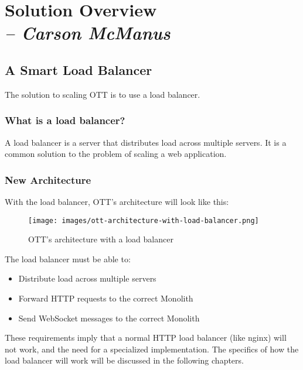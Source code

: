 \chapter{Solution Overview \\
  \small{\textit{-- Carson McManus}}
  \label{Chapter::SolutionOverview}}

\section{A Smart Load Balancer}

The solution to scaling OTT is to use a load balancer.

\subsection{What is a load balancer?}

A load balancer is a server that distributes load across multiple servers. It is a common solution to the problem of scaling a web application.

\subsection{New Architecture}

With the load balancer, OTT's architecture will look like this:

\begin{figure}[!h]
  \centering
  \texttt{[image: images/ott-architecture-with-load-balancer.png]}
  \caption{OTT's architecture with a load balancer}
  \label{fig:ott-architecture-with-load-balancer}
\end{figure}

The load balancer must be able to:
\begin{itemize}
  \item Distribute load across multiple servers
  \item Forward HTTP requests to the correct Monolith
  \item Send WebSocket messages to the correct Monolith
\end{itemize}

These requirements imply that a normal HTTP load balancer (like nginx) will not work, and the need for a specialized implementation. The specifics of how the load balancer will work will be discussed in the following chapters.

